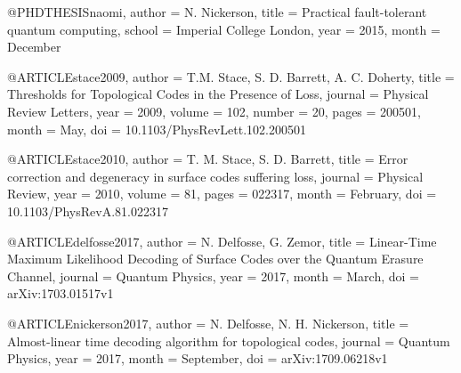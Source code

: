 
@PHDTHESIS{naomi,
  author =       {N. Nickerson},
  title =        {Practical fault-tolerant quantum computing},
  school =       {Imperial College London},
  year =         {2015},
  month =        {December}
}

@ARTICLE{stace2009,
  author =       {T.M. Stace, S. D. Barrett, A. C. Doherty},
  title =        {Thresholds for Topological Codes in the Presence of
  Loss},
  journal =      {Physical Review Letters},
  year =         {2009},
  volume =       {102},
  number =       {20},
  pages =        {200501},
  month =        {May},
  doi =          {10.1103/PhysRevLett.102.200501}
}

@ARTICLE{stace2010,
  author =       {T. M. Stace, S. D. Barrett},
  title =        {Error correction and degeneracy in surface codes
  suffering loss},
  journal =      {Physical Review},
  year =         {2010},
  volume =       {81},
  pages =        {022317},
  month =        {February},
  doi =          {10.1103/PhysRevA.81.022317}
}

@ARTICLE{delfosse2017,
  author =       {N. Delfosse, G. Zemor},
  title =        {Linear-Time Maximum Likelihood Decoding of Surface Codes
  over the Quantum Erasure Channel},
  journal =      {Quantum Physics},
  year =         {2017},
  month =        {March},
  doi =          {arXiv:1703.01517v1}
}

@ARTICLE{nickerson2017,
  author =       {N. Delfosse, N. H. Nickerson},
  title =        {Almost-linear time decoding algorithm for topological
  codes},
  journal =      {Quantum Physics},
  year =         {2017},
  month =        {September},
  doi =          {arXiv:1709.06218v1}
}
